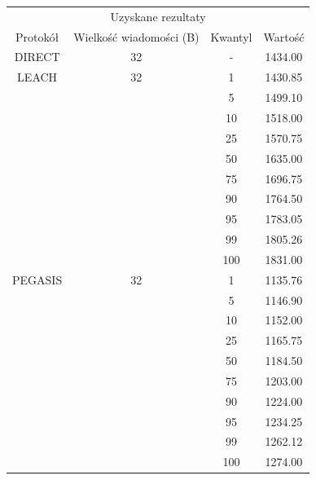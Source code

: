 \documentclass[a4paper,12pt,twoside,openany]{report}
\begin{document}
\begin{longtable}{*{4}{c}}
\toprule
\multicolumn{4}{c}{Uzyskane rezultaty} \\
Protokół	& Wielkość wiadomości (B)	& Kwantyl	& Wartość \\
\midrule
\endhead
DIRECT	& 32 	& -	& 1434.00 \\*
\midrule
LEACH	& 32	& 1	& 1430.85 \\*
	&	& 5	& 1499.10 \\*
	&	& 10	& 1518.00 \\*
	&	& 25	& 1570.75 \\*
	&	& 50	& 1635.00 \\*
	&	& 75	& 1696.75 \\*
	&	& 90	& 1764.50 \\*
	&	& 95	& 1783.05 \\*
	&	& 99	& 1805.26 \\*
	&	& 100	& 1831.00 \\*
\midrule
PEGASIS	& 32	& 1	& 1135.76 \\*
	&	& 5	& 1146.90 \\*
	&	& 10	& 1152.00 \\*
	&	& 25	& 1165.75 \\*
	&	& 50	& 1184.50 \\*
	&	& 75	& 1203.00 \\*
	&	& 90	& 1224.00 \\*
	&	& 95	& 1234.25 \\*
	&	& 99	& 1262.12 \\*
	&	& 100	& 1274.00 \\*
\bottomrule
\end{longtable}
\end{document}
